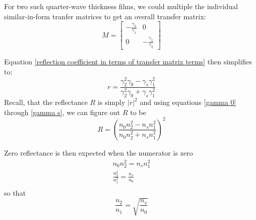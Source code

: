 For two such quarter-wave thickness films, we could multiple the individual similar-in-form tranfer matrices to get an overall transfer matrix:
\[
M = 
    \begin{bmatrix}
    -\frac{\gamma_2}{\gamma_1} & 0 \\
    0 & -\frac{\gamma_1}{\gamma_2}
  \end{bmatrix}
\]

Equation \ref{reflection coefficient in terms of transfer matrix terms} then simplifies to:
\begin{equation}\label{reflection coefficient for 2-layer antireflecting films}
r = \frac{\gamma_2^2\gamma_0 - \gamma_s\gamma_1^2}{\gamma_2^2\gamma_0 + \gamma_s\gamma_1^2}
\end{equation}
Recall, that the reflectance $R$ is simply $|r|^2$ and using equations \ref{gamma 0} through \ref{gamma s}, we can figure out $R$ to be
\begin{equation}\label{reflectance for 2-layer antireflecting films}
R = \left(\frac{n_0n_2^2 - n_sn_1^2}{n_0n_2^2 + n_sn_1^2}\right)^2
\end{equation}

Zero reflectance is then expected when the numerator is zero
\begin{align*}
    n_0n_2^2 = n_sn_1^2 \\
    \frac{n_2^2}{n_1^2} = \frac{n_s}{n_0}  \\
\end{align*} so that
\begin{equation}\label{zero reflectance criterion}
\frac{n_2}{n_1} = \sqrt{\frac{n_s}{n_0}}
\end{equation}

